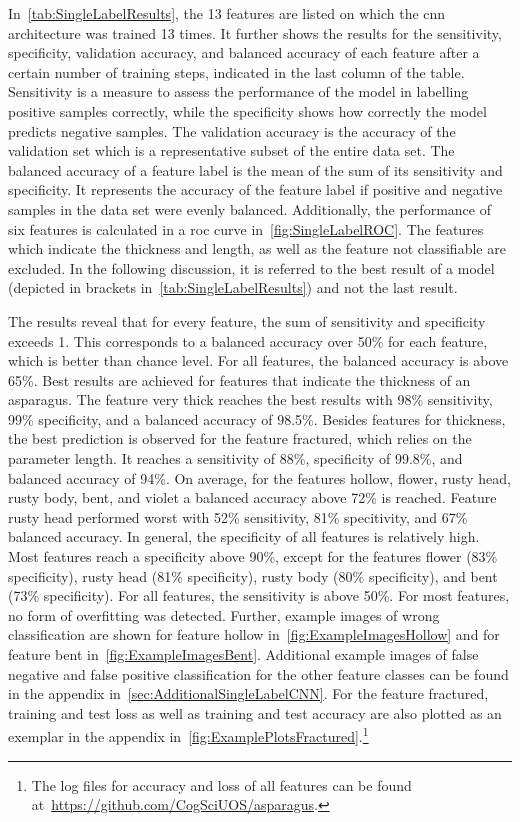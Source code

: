 \bigskip
In~\autoref{tab:SingleLabelResults}, the 13 features are listed on which the \acrshort{cnn} architecture was trained 13 times. It further shows the results for the sensitivity, specificity, validation accuracy, and balanced accuracy of each feature after a certain number of training steps, indicated in the last column of the table.
Sensitivity is a measure to assess the performance of the model in labelling positive samples correctly, while the specificity shows how correctly the model predicts negative samples. The validation accuracy is the accuracy of the validation set which is a representative subset of the entire data set. The balanced accuracy of a feature label is the mean of the sum of its sensitivity and specificity. It represents the accuracy of the feature label if positive and negative samples in the data set were evenly balanced.
Additionally, the performance of six features is calculated in a \acrshort{roc} curve in~\ref{fig:SingleLabelROC}. The features which indicate the thickness and length, as well as the feature not classifiable are excluded.
In the following discussion, it is referred to the best result of a model (depicted in brackets in~\autoref{tab:SingleLabelResults}) and not the last result.

The results reveal that for every feature, the sum of sensitivity and specificity exceeds 1.  This corresponds to a balanced accuracy over 50\% for each feature, which is better than chance level. For all features, the balanced accuracy is above 65\%. Best results are achieved for features that indicate the thickness of an asparagus. The feature very thick reaches the best results with 98\% sensitivity, 99\% specificity, and a balanced accuracy of 98.5\%. Besides features for thickness, the best prediction is observed for the feature fractured, which relies on the parameter length. It reaches a sensitivity of 88\%, specificity of 99.8\%, and balanced accuracy of 94\%.
On average, for the features hollow, flower, rusty head, rusty body, bent, and violet a balanced accuracy above 72\% is reached. Feature rusty head performed worst with 52\% sensitivity, 81\% specitivity, and 67\% balanced accuracy. In general, the specificity of all features is relatively high. Most features reach a specificity above 90\%, except for the features flower (83\% specificity), rusty head (81\% specificity), rusty body (80\% specificity), and bent (73\% specificity). For all features, the sensitivity is above 50\%. For most features, no form of overfitting was detected.
Further, example images of wrong classification are shown for feature hollow in~\autoref{fig:ExampleImagesHollow} and for feature bent in~\autoref{fig:ExampleImagesBent}. Additional example images of false negative and false positive classification for the other feature classes can be found in the appendix in~\autoref{sec:AdditionalSingleLabelCNN}. For the feature fractured, training and test loss as well as training and test accuracy are also plotted as an exemplar in the appendix in~\autoref{fig:ExamplePlotsFractured}.\footnote{The log files for accuracy and loss of all features can be found at~\url{https://github.com/CogSciUOS/asparagus}.}
 
